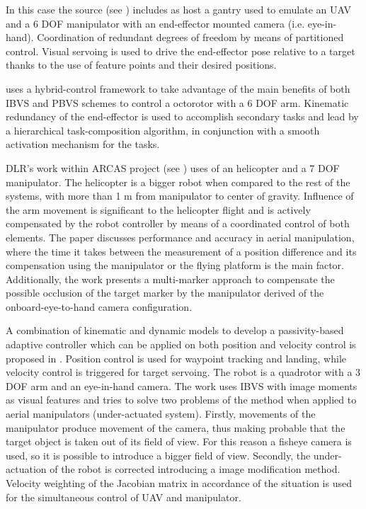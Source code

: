 
In this case the source (see \cite{danko_evaluation_2014}) includes as host a gantry used to emulate an UAV and a 6 DOF manipulator with an end-effector mounted camera (i.e. eye-in-hand). Coordination of redundant degrees of freedom by means of partitioned control. Visual servoing is used to drive the end-effector pose relative to a target thanks to the use of feature points and their desired positions.


\cite{lippiello_hybrid_2016} uses a hybrid-control framework to take advantage of the main benefits of both IBVS and PBVS schemes to control a octorotor with a 6 DOF arm. Kinematic redundancy of the end-effector is used to accomplish secondary tasks and lead by a hierarchical task-composition algorithm, in conjunction with a smooth activation mechanism for the tasks.



DLR's work within ARCAS project (see \cite{laiacker_high_2016}) uses of an helicopter and a 7 DOF manipulator. The helicopter is a bigger robot when compared to the rest of the systems, with more than 1 m from manipulator to center of gravity. Influence of the arm movement is significant to the helicopter flight and is actively compensated by the robot controller by means of a coordinated control of both elements. The paper discusses performance and accuracy in aerial manipulation, where the time it takes between the measurement of a position difference and its compensation using the manipulator or the flying platform is the main factor. Additionally, the work presents a multi-marker approach to compensate the possible occlusion of the target marker by the manipulator derived of the onboard-eye-to-hand camera configuration.



A combination of kinematic and dynamic models to develop a passivity-based adaptive controller which can be applied on both position and velocity control is proposed in \cite{kim_vision-guided_2016}. Position control is used for waypoint tracking and landing, while velocity control is triggered for target servoing. The robot is a quadrotor with a 3 DOF arm and an eye-in-hand camera. The work uses IBVS with image moments as visual features and tries to solve two problems of the method when applied to aerial manipulators (under-actuated system). Firstly, movements of the manipulator produce movement of the camera, thus making probable that the target object is taken out of its field of view. For this reason a fisheye camera is used, so it is possible to introduce a bigger field of view. Secondly, the under-actuation of the robot is corrected introducing a image modification method. Velocity weighting of the Jacobian matrix in accordance of the situation is used for the simultaneous control of UAV and manipulator.

